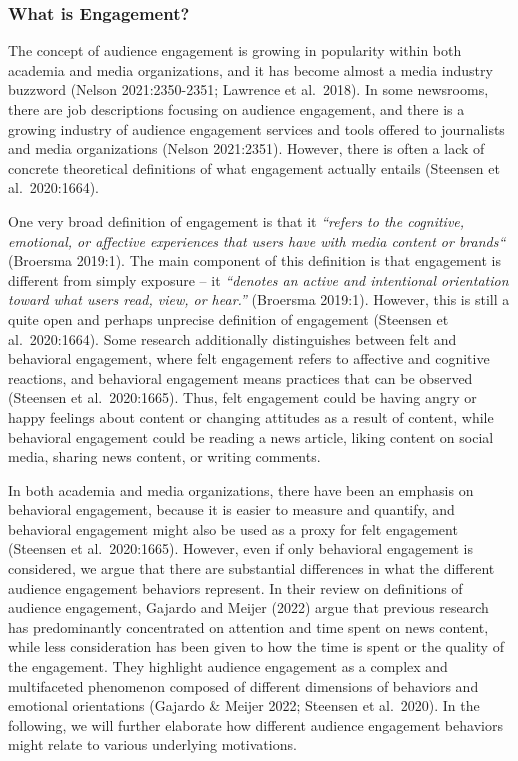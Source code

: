 \documentclass[
]{article}
\begin{document}
\hypertarget{what-is-engagement}{%
\subsubsection{What is Engagement?}\label{what-is-engagement}}

\noindent The concept of audience engagement is growing in popularity
within both academia and media organizations, and it has become almost a
media industry buzzword (Nelson 2021:2350-2351; Lawrence et al.~2018).
In some newsrooms, there are job descriptions focusing on audience
engagement, and there is a growing industry of audience engagement
services and tools offered to journalists and media organizations
(Nelson 2021:2351). However, there is often a lack of concrete
theoretical definitions of what engagement actually entails (Steensen et
al.~2020:1664).

One very broad definition of engagement is that it \emph{``refers to the
cognitive, emotional, or affective experiences that users have with
media content or brands``} (Broersma 2019:1). The main component of this
definition is that engagement is different from simply exposure -- it
\emph{``denotes an active and intentional orientation toward what users
read, view, or hear.''} (Broersma 2019:1). However, this is still a
quite open and perhaps unprecise definition of engagement (Steensen et
al.~2020:1664). Some research additionally distinguishes between felt
and behavioral engagement, where felt engagement refers to affective and
cognitive reactions, and behavioral engagement means practices that can
be observed (Steensen et al.~2020:1665). Thus, felt engagement could be
having angry or happy feelings about content or changing attitudes as a
result of content, while behavioral engagement could be reading a news
article, liking content on social media, sharing news content, or
writing comments.

In both academia and media organizations, there have been an emphasis on
behavioral engagement, because it is easier to measure and quantify, and
behavioral engagement might also be used as a proxy for felt engagement
(Steensen et al.~2020:1665). However, even if only behavioral engagement
is considered, we argue that there are substantial differences in what
the different audience engagement behaviors represent. In their review
on definitions of audience engagement, Gajardo and Meijer (2022) argue
that previous research has predominantly concentrated on attention and
time spent on news content, while less consideration has been given to
how the time is spent or the quality of the engagement. They highlight
audience engagement as a complex and multifaceted phenomenon composed of
different dimensions of behaviors and emotional orientations (Gajardo \&
Meijer 2022; Steensen et al.~2020). In the following, we will further
elaborate how different audience engagement behaviors might relate to
various underlying motivations.
\end{document}
